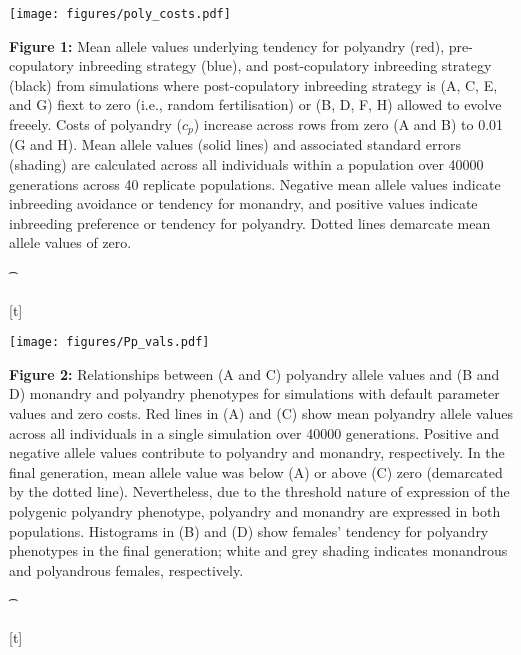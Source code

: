 \documentclass[10pt,letterpaper]{article}
\begin{document}
 {\color{Gray}
\begin{adjustwidth}{-2.2in}{0in}
{%
   \texttt{[image: figures/poly\_costs.pdf]}%
}%
{%
   \begin{justify}\vspace{10 mm} \textbf{Figure 1:} Mean allele values underlying tendency for polyandry (red), pre-copulatory inbreeding strategy (blue), and post-copulatory inbreeding strategy (black) from simulations where post-copulatory inbreeding strategy is (A, C, E, and G) fiext to zero (i.e., random fertilisation) or (B, D, F, H) allowed to evolve freeely. Costs of polyandry ($c_{p}$) increase across rows from zero (A and B) to 0.01 (G and H). Mean allele values (solid lines) and associated standard errors (shading) are calculated across all individuals within a population over 40000 generations across 40 replicate populations. Negative mean allele values indicate inbreeding avoidance or tendency for monandry, and positive values indicate inbreeding preference or tendency for polyandry. Dotted lines demarcate mean allele values of zero. \end{justify}{\t}%
}[t]
\end{adjustwidth}
}


{\color{Gray}
\begin{adjustwidth}{-2.2in}{0in}
{%
   \texttt{[image: figures/Pp\_vals.pdf]}%
}%
{%
   \begin{justify}\vspace{0.25 mm} \textbf{Figure 2:} Relationships between (A and C) polyandry allele values and (B and D) monandry and polyandry phenotypes for simulations with default parameter values and zero costs. Red lines in (A) and (C) show mean polyandry allele values across all individuals in a single simulation over 40000 generations. Positive and negative allele values contribute to polyandry and monandry, respectively. In the final generation, mean allele value was below (A) or above (C) zero (demarcated by the dotted line). Nevertheless, due to the threshold nature of expression of the polygenic polyandry phenotype, polyandry and monandry are expressed in both populations. Histograms in (B) and (D) show females' tendency for polyandry phenotypes in the final generation; white and grey shading indicates monandrous and polyandrous females, respectively.\end{justify}{\t}%
}[t]
\end{adjustwidth}
}
\end{document}
